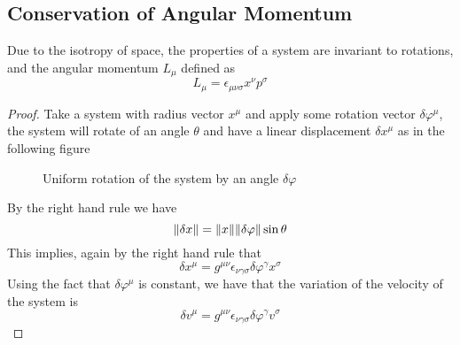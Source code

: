 \documentclass[../admech.tex]{subfiles}
\begin{document}
\subsection{Conservation of Angular Momentum}
\begin{thm}
	Due to the isotropy of space, the properties of a system are invariant to rotations, and the angular momentum $L_\mu$ defined as
	\begin{equation*}
		L_\mu=\epsilon_{\mu\nu\sigma}x^\nu p^\sigma
	\end{equation*}
\end{thm}
\begin{proof}
	Take a system with radius vector $x^\mu$ and apply some rotation vector $\delta\varphi^\mu$, the system will rotate of an angle $\theta$ and have a linear displacement $\delta x^\mu$ as in the following figure
	\begin{figure}[H]
		\centering
		\caption{Uniform rotation of the system by an angle $\delta\varphi$}
		\label{fig:rotvec}
	\end{figure}
	By the right hand rule we have
	\begin{equation}
		\norm{\delta x}=\norm{x}\norm{\delta\varphi}\sin\theta
		\label{eq:normdeltaxrot}
	\end{equation}
	This implies, again by the right hand rule that
	\begin{equation}
		\delta x^\mu=g^{\mu\nu}\epsilon_{\nu\gamma\sigma}\delta\varphi^\gamma x^\sigma
		\label{eq:deltaxmuvec}
	\end{equation}
	Using the fact that $\delta\varphi^\mu$ is constant, we have that the variation of the velocity of the system is
	\begin{equation}
		\delta v^\mu=g^{\mu\nu}\epsilon_{\nu\gamma\sigma}\delta\varphi^\gamma v^\sigma

\end{equation}
\end{proof}
\end{document}
